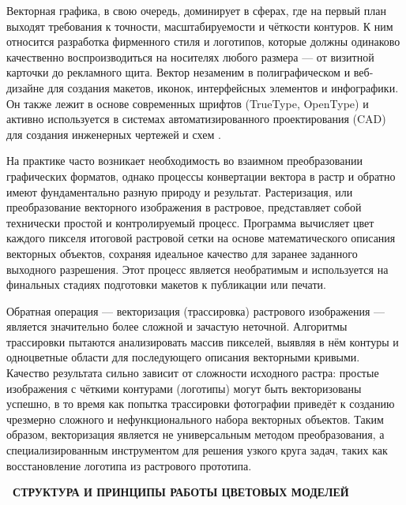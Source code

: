 \documentclass{SibFU-docs}
\begin{document}
Векторная графика, в свою очередь, доминирует в сферах, где на первый план выходят требования к точности, масштабируемости и чёткости контуров. К ним относится разработка фирменного стиля и логотипов, которые должны одинаково качественно воспроизводиться на носителях любого размера — от визитной карточки до рекламного щита. Вектор незаменим в полиграфическом и веб-дизайне для создания макетов, иконок, интерфейсных элементов и инфографики. Он также лежит в основе современных шрифтов (TrueType, OpenType) и активно используется в системах автоматизированного проектирования (CAD) для создания инженерных чертежей и схем \cite{rastr_vs_vector}.


На практике часто возникает необходимость во взаимном преобразовании графических форматов, однако процессы конвертации вектора в растр и обратно имеют фундаментально разную природу и результат. Растеризация, или преобразование векторного изображения в растровое, представляет собой технически простой и контролируемый процесс. Программа вычисляет цвет каждого пикселя итоговой растровой сетки на основе математического описания векторных объектов, сохраняя идеальное качество для заранее заданного выходного разрешения. Этот процесс является необратимым и используется на финальных стадиях подготовки макетов к публикации или печати.

Обратная операция — векторизация (трассировка) растрового изображения — является значительно более сложной и зачастую неточной. Алгоритмы трассировки пытаются анализировать массив пикселей, выявляя в нём контуры и одноцветные области для последующего описания векторными кривыми. Качество результата сильно зависит от сложности исходного растра: простые изображения с чёткими контурами (логотипы) могут быть векторизованы успешно, в то время как попытка трассировки фотографии приведёт к созданию чрезмерно сложного и нефункционального набора векторных объектов. Таким образом, векторизация является не универсальным методом преобразования, а специализированным инструментом для решения узкого круга задач, таких как восстановление логотипа из растрового прототипа.

\newpage
{}
\begin{center}\textbf{\thesection\ СТРУКТУРА И ПРИНЦИПЫ РАБОТЫ ЦВЕТОВЫХ МОДЕЛЕЙ}\end{center}
\vspace*{-1.5em}
\end{document}
